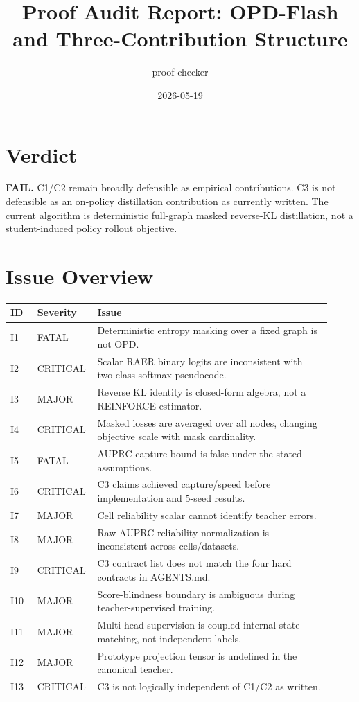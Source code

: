 \documentclass[11pt]{article}
\title{Proof Audit Report: OPD-Flash and Three-Contribution Structure}
\author{proof-checker}
\date{2026-05-19}
\begin{document}
\maketitle

\section*{Verdict}

\textbf{\textcolor{critical}{FAIL}.} C1/C2 remain broadly defensible as
empirical contributions. C3 is not defensible as an on-policy distillation
contribution as currently written. The current algorithm is deterministic
full-graph masked reverse-KL distillation, not a student-induced policy rollout
objective.

\section*{Issue Overview}

\begin{longtable}{p{0.08\linewidth}p{0.14\linewidth}p{0.70\linewidth}}
\textbf{ID} & \textbf{Severity} & \textbf{Issue} \\
\hline
I1 & FATAL & Deterministic entropy masking over a fixed graph is not OPD. \\
I2 & CRITICAL & Scalar RAER binary logits are inconsistent with two-class softmax pseudocode. \\
I3 & MAJOR & Reverse KL identity is closed-form algebra, not a REINFORCE estimator. \\
I4 & CRITICAL & Masked losses are averaged over all nodes, changing objective scale with mask cardinality. \\
I5 & FATAL & AUPRC capture bound is false under the stated assumptions. \\
I6 & CRITICAL & C3 claims achieved capture/speed before implementation and 5-seed results. \\
I7 & MAJOR & Cell reliability scalar cannot identify teacher errors. \\
I8 & MAJOR & Raw AUPRC reliability normalization is inconsistent across cells/datasets. \\
I9 & CRITICAL & C3 contract list does not match the four hard contracts in AGENTS.md. \\
I10 & MAJOR & Score-blindness boundary is ambiguous during teacher-supervised training. \\
I11 & MAJOR & Multi-head supervision is coupled internal-state matching, not independent labels. \\
I12 & MAJOR & Prototype projection tensor is undefined in the canonical teacher. \\
I13 & CRITICAL & C3 is not logically independent of C1/C2 as written. \\
\end{longtable}
\end{document}
